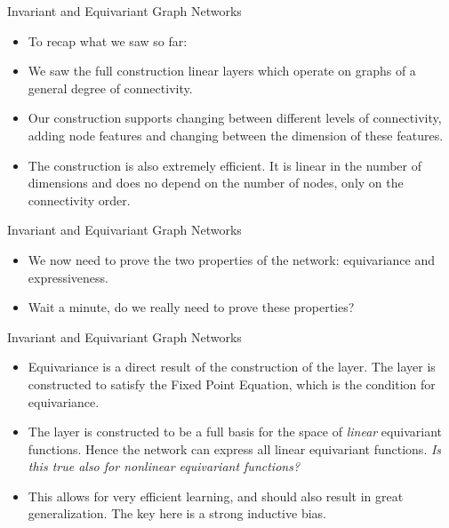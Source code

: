 \documentclass{beamer}
\begin{document}
\begin{frame}{Invariant and Equivariant Graph Networks}
    \begin{itemize}
        \setlength{\itemsep}{\fill}
        \item To recap what we saw so far:
        \pause
        \item We saw the full construction linear layers which operate on graphs of a general degree of connectivity.
        \pause
        \item Our construction supports changing between different levels of connectivity, adding node features and changing between the dimension of these features.
        \pause
        \item The construction is also extremely efficient. It is linear in the number of dimensions and does no depend on the number of nodes, only on the connectivity order.
    \end{itemize}
\end{frame}
\begin{frame}{Invariant and Equivariant Graph Networks}
    \begin{itemize}
        \setlength{\itemsep}{\fill}    
        \item We now need to prove the two properties of the network: equivariance and expressiveness.
        \pause
        \item Wait a minute, do we really need to prove these properties?
        
    \end{itemize}
\end{frame}
\begin{frame}{Invariant and Equivariant Graph Networks}
    \begin{itemize}
        \setlength{\itemsep}{\fill}
        \item Equivariance is a direct result of the construction of the layer. The layer is constructed to satisfy the Fixed Point Equation, which is the condition for equivariance. \pause
        \item The layer is constructed to be a full basis for the space of \textit{linear} equivariant functions. Hence the network can express all linear equivariant functions. \textit{Is this true also for nonlinear equivariant functions?} \pause    
        \item This allows for very efficient learning, and should also result in great generalization. The key here is a strong inductive bias.
    \end{itemize}
\end{frame}
\end{document}
